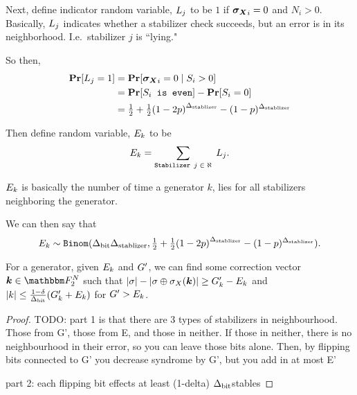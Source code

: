




Next, define indicator random variable, $L_j$ to be $1$ if $\boldsymbol{\boldsymbol{\sigma_X}}_i = 0$ and $N_i > 0$.
Basically, $L_j$ indicates whether a stabilizer check succeeds, but an error is in
its neighborhood. I.e.\ stabilizer $j$ is ``lying."

\newcommand{\LyingIndivPr}{\half + \half \mleft( 1 - 2p\mright)^\NTQ - (1-p)^\NTQ}

So then,
\begin{align*}
	\Pr[L_j = 1] &= \Pr\mleft[\synd_i = 0\; \middle|\; S_i > 0\mright] \\
		&= \Pr[\texttt{$S_i$ is even}] - \Pr[S_i = 0] \\
		&= \LyingIndivPr
\end{align*}


Then define random variable, $E_k$ to be
$$
	E_k = 
		\sum_{\texttt{Stabilizer $j$} \; \in \; \aleph}\;
				L_j.
$$

$E_k$ is basically the number of time a generator $k$, lies for all
stabilizers neighboring the generator.

We can then say that
$$
	\lyingGenerator_k \sim \texttt{Binom}(\NTS \NTQ, \LyingIndivPr).
$$

\begin{lemma}{For a generator, given $E_k$ and $G'$,
\label{lemma:decrby}
	we can find some correction vector $\correctionvec \in \F_2^\NQubits$
	such that \linebreak $|\sigma| - |\sigma \oplus \sigma_X(\boldsymbol{\boldsymbol{k}})| \geq G'_k - E_k$}
	and $|k| \leq \frac{1-\delta}{{\Delta_{\text{bit}}}} (G'_k + E_k)$ for $G' > E_k$.
	\begin{proof}
		TODO:	 part 1 is that there are 3 types of stabilizers in neighbourhood.
		Those from G', those from E, and those in neither. If those in neither, there is no
		neighbourhood in their error, so you can leave those bits alone. Then, by flipping bits
		connected to G' you decrease syndrome by G', but you add in at most E'
		
		part 2: each flipping bit effects at least (1-delta) ${\Delta_{\text{bit}}}$stables
	\end{proof}
\end{lemma}


